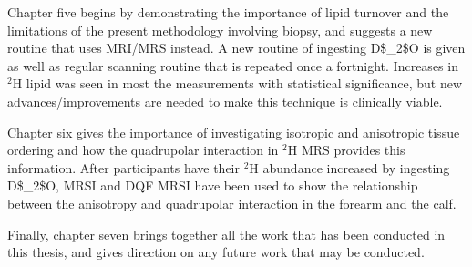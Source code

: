 Chapter five begins by demonstrating the importance of lipid turnover and the limitations of the present methodology involving biopsy, and suggests a new routine that uses \ac{MRI}/\ac{MRS} instead. A new routine of ingesting \ac{D$_2$O} is given as well as regular scanning routine that is repeated once a fortnight. Increases in $^2$H lipid was seen in most the measurements with statistical significance, but new advances/improvements are needed to make this technique is clinically viable.

Chapter six gives the importance of investigating isotropic and anisotropic tissue ordering and how the quadrupolar interaction in $^2$H \ac{MRS} provides this information. After participants have their $^2$H abundance increased by ingesting \ac{D$_2$O}, \ac{MRSI} and \ac{DQF} \ac{MRSI} have been used to show the relationship between the anisotropy and quadrupolar interaction in the forearm and the calf.

Finally, chapter seven brings together all the work that has been conducted in this thesis, and gives direction on any future work that may be conducted.